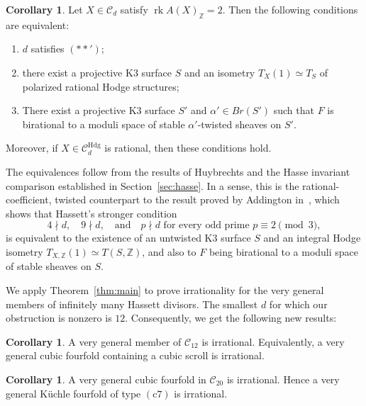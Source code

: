 \documentclass[10pt]{amsart}
\numberwithin{equation}{section}
\theoremstyle{definition}
\newtheorem{corollary}[theorem]{Corollary}
\theoremstyle{plain}
\numberwithin{theorem}{section}
\newcommand{\Z}{\mathbb{Z}}
\newcommand{\Ccal}{\mathcal{C}}
\newcommand{\rk}{\operatorname{rk}}
\begin{document}
\begin{corollary}
\label{cor:rational-addington}
Let $X\in\mathcal C_d$ satisfy $\rk A(X)_{\Z}=2$. Then the following conditions are equivalent:
\begin{enumerate}
    \item \(d\) satisfies \((**')\);
    \item there exist a projective K3 surface $S$ and an isometry $T_X(1)\simeq T_S$ of polarized rational Hodge structures;
    \item There exist a projective K3 surface $S'$ and $\alpha' \in Br(S')$ such that $F$ is birational to a moduli space of stable \(\alpha'\)-twisted sheaves on \(S'\).
\end{enumerate}
Moreover, if $X\in\mathcal C_d^{\mathrm{Hdg}}$ is rational, then
these conditions hold.
\end{corollary}
The equivalences follow from the results of Huybrechts and the Hasse invariant comparison established in Section~\ref{sec:hasse}. In a sense, this is the rational-coefficient, twisted counterpart to the result proved by Addington in~\cite[Theorem~1]{Addington_2016}, which shows that Hassett's stronger condition 
\begin{equation}
4 \nmid d, \quad 9 \nmid d, \quad \text{and} \quad p \nmid d \text{ for every odd prime } p \equiv 2 \pmod 3,
\tag{$**$}\label{eq:hassett}
\end{equation}
is equivalent to the existence of an untwisted K3 surface $S$ and an integral Hodge isometry
$T_{X,\Z}(1)
\simeq
T(S, \Z)$,
and also to $F$ being birational to a moduli space of stable sheaves on $S$.

We apply Theorem~\ref{thm:main} to prove irrationality for the very
general members of infinitely many Hassett divisors. The smallest $d$ for which our obstruction is nonzero is $12$. Consequently, we get the following new results: 
\begin{corollary}\label{cor:c12}
A very general member of $\mathcal C_{12}$ is irrational.
Equivalently, a very general cubic fourfold containing a cubic scroll
is irrational.
\end{corollary}
\begin{corollary}\label{cor:c20}
A very general cubic fourfold in $\Ccal_{20}$ is irrational. Hence a very general K\"uchle fourfold of type $(\mathrm{c7})$ is irrational.
\end{corollary}
 
\end{document}

